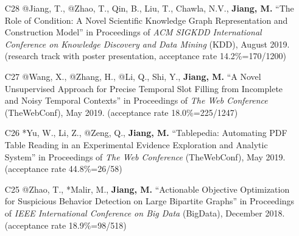 \documentclass[10pt]{article}
\newenvironment{myindentpar}[1]%
{\begin{list}{}%
         {\setlength{\leftmargin}{#1}}%
         \item[]%
}
{\end{list}}
\newcounter{list}
\newcommand{\hide}[1]{}
\begin{document}
\begin{myindentpar}{0.00cm}
\begin{enumerate}[leftmargin=.5cm]
\item[C28] @Jiang, T., @Zhao, T., Qin, B., Liu, T., Chawla, N.V., \textbf{Jiang, M.} ``The Role of Condition: A Novel Scientific Knowledge Graph Representation and Construction Model'' in Proceedings of \emph{ACM SIGKDD International Conference on Knowledge Discovery and Data Mining} (KDD), August 2019. (research track with poster presentation, acceptance rate 14.2\%=170/1200)

	\hide{\vspace{-0.1cm}\hspace{0.5cm}{\small \emph{I made 30\% contribution and Mr. Jiang made 60\%. I conceived the idea. Mr. Jiang designed the study, implemented the system, and did the experiments. I wrote the introduction. Mr. Jiang wrote the rest of the paper.}}}

\item[C27] @Wang, X., @Zhang, H., @Li, Q., Shi, Y., \textbf{Jiang, M.} ``A Novel Unsupervised Approach for Precise Temporal Slot Filling from Incomplete and Noisy Temporal Contexts'' in Proceedings of \emph{The Web Conference } (TheWebConf), May 2019. (acceptance rate 18.0\%=225/1247)

	\hide{\vspace{-0.1cm}\hspace{0.5cm}{\small \emph{I made 75\% contribution and Ms. Wang made 20\%. I conceived the idea, designed the study, and implemented the system. Ms. Wang did the experiments. Ms. Wang and I wrote the paper.}}}

\item[C26] *Yu, W., Li, Z., @Zeng, Q., \textbf{Jiang, M.} ``Tablepedia: Automating PDF Table Reading in an Experimental Evidence Exploration and Analytic System'' in Proceedings of \emph{The Web Conference } (TheWebConf), May 2019. (acceptance rate 44.8\%=26/58)

	\hide{\vspace{-0.1cm}\hspace{0.5cm}{\small \emph{I made 30\% contribution and Mr. Yu made 60\%. I conceived the idea and designed the study. Mr. Yu (junior) implemented the system and did the experiments. Mr. Yu and I wrote the paper.}}}

\item[C25] @Zhao, T., *Malir, M., \textbf{Jiang, M.} ``Actionable Objective Optimization for Suspicious Behavior Detection on Large Bipartite Graphs'' in Proceedings of \emph{IEEE International Conference on Big Data} (BigData), December 2018. (acceptance rate 18.9\%=98/518)


\end{enumerate}
\end{myindentpar}
\end{document}
